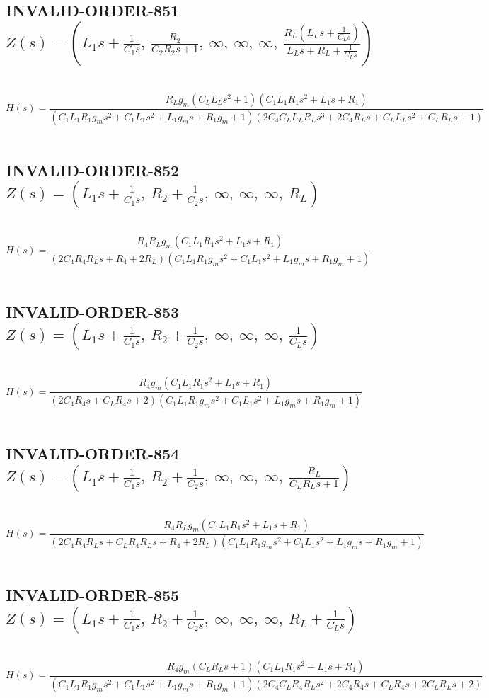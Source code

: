 \documentclass{article}
\begin{document}
\subsection{INVALID-ORDER-851 $Z(s) = \left( L_{1} s + \frac{1}{C_{1} s}, \  \frac{R_{2}}{C_{2} R_{2} s + 1}, \  \infty, \  \infty, \  \infty, \  \frac{R_{L} \left(L_{L} s + \frac{1}{C_{L} s}\right)}{L_{L} s + R_{L} + \frac{1}{C_{L} s}}\right)$ } \ 
\textbf{\[H(s) = \frac{R_{L} g_{m} \left(C_{L} L_{L} s^{2} + 1\right) \left(C_{1} L_{1} R_{1} s^{2} + L_{1} s + R_{1}\right)}{\left(C_{1} L_{1} R_{1} g_{m} s^{2} + C_{1} L_{1} s^{2} + L_{1} g_{m} s + R_{1} g_{m} + 1\right) \left(2 C_{4} C_{L} L_{L} R_{L} s^{3} + 2 C_{4} R_{L} s + C_{L} L_{L} s^{2} + C_{L} R_{L} s + 1\right)}\] } \ 
\subsection{INVALID-ORDER-852 $Z(s) = \left( L_{1} s + \frac{1}{C_{1} s}, \  R_{2} + \frac{1}{C_{2} s}, \  \infty, \  \infty, \  \infty, \  R_{L}\right)$ } \ 
\textbf{\[H(s) = \frac{R_{4} R_{L} g_{m} \left(C_{1} L_{1} R_{1} s^{2} + L_{1} s + R_{1}\right)}{\left(2 C_{4} R_{4} R_{L} s + R_{4} + 2 R_{L}\right) \left(C_{1} L_{1} R_{1} g_{m} s^{2} + C_{1} L_{1} s^{2} + L_{1} g_{m} s + R_{1} g_{m} + 1\right)}\] } \ 
\subsection{INVALID-ORDER-853 $Z(s) = \left( L_{1} s + \frac{1}{C_{1} s}, \  R_{2} + \frac{1}{C_{2} s}, \  \infty, \  \infty, \  \infty, \  \frac{1}{C_{L} s}\right)$ } \ 
\textbf{\[H(s) = \frac{R_{4} g_{m} \left(C_{1} L_{1} R_{1} s^{2} + L_{1} s + R_{1}\right)}{\left(2 C_{4} R_{4} s + C_{L} R_{4} s + 2\right) \left(C_{1} L_{1} R_{1} g_{m} s^{2} + C_{1} L_{1} s^{2} + L_{1} g_{m} s + R_{1} g_{m} + 1\right)}\] } \ 
\subsection{INVALID-ORDER-854 $Z(s) = \left( L_{1} s + \frac{1}{C_{1} s}, \  R_{2} + \frac{1}{C_{2} s}, \  \infty, \  \infty, \  \infty, \  \frac{R_{L}}{C_{L} R_{L} s + 1}\right)$ } \ 
\textbf{\[H(s) = \frac{R_{4} R_{L} g_{m} \left(C_{1} L_{1} R_{1} s^{2} + L_{1} s + R_{1}\right)}{\left(2 C_{4} R_{4} R_{L} s + C_{L} R_{4} R_{L} s + R_{4} + 2 R_{L}\right) \left(C_{1} L_{1} R_{1} g_{m} s^{2} + C_{1} L_{1} s^{2} + L_{1} g_{m} s + R_{1} g_{m} + 1\right)}\] } \ 
\subsection{INVALID-ORDER-855 $Z(s) = \left( L_{1} s + \frac{1}{C_{1} s}, \  R_{2} + \frac{1}{C_{2} s}, \  \infty, \  \infty, \  \infty, \  R_{L} + \frac{1}{C_{L} s}\right)$ } \ 
\textbf{\[H(s) = \frac{R_{4} g_{m} \left(C_{L} R_{L} s + 1\right) \left(C_{1} L_{1} R_{1} s^{2} + L_{1} s + R_{1}\right)}{\left(C_{1} L_{1} R_{1} g_{m} s^{2} + C_{1} L_{1} s^{2} + L_{1} g_{m} s + R_{1} g_{m} + 1\right) \left(2 C_{4} C_{L} R_{4} R_{L} s^{2} + 2 C_{4} R_{4} s + C_{L} R_{4} s + 2 C_{L} R_{L} s + 2\right)}\] } \ 
\end{document}
